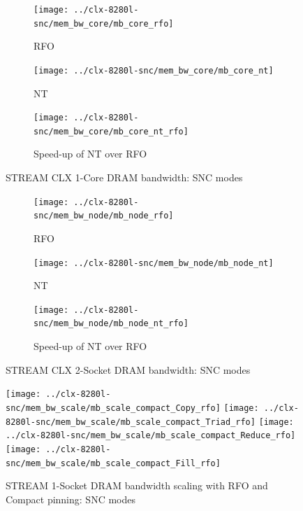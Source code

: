 \documentclass{article}
\begin{document}
\begin{figure}[!hb]
    \centering
    \begin{subfigure}[!hb]{0.3\textwidth}
         \centering
         \texttt{[image: ../clx-8280l-snc/mem\_bw\_core/mb\_core\_rfo]}
         \caption{RFO}
         \label{figure:mem_bw_core_rfo_clx_snc}
    \end{subfigure}
    \begin{subfigure}[!hb]{0.3\textwidth}
         \centering
         \texttt{[image: ../clx-8280l-snc/mem\_bw\_core/mb\_core\_nt]}
         \caption{NT}
         \label{figure:mem_bw_core_nt_clx_snc}
    \end{subfigure}
    \begin{subfigure}[!hb]{0.3\textwidth}
         \centering
         \texttt{[image: ../clx-8280l-snc/mem\_bw\_core/mb\_core\_nt\_rfo]}
         \caption{Speed-up of NT over RFO}
         \label{figure:mem_bw_core_nt_rfo_clx_snc}
    \end{subfigure}

    \caption{STREAM CLX 1-Core DRAM bandwidth: SNC modes}
    \label{figure:mem_bw_core_clx_snc}
\end{figure}

\begin{figure}[!hb]
    \centering
    \begin{subfigure}[!hb]{0.3\textwidth}
         \centering
         \texttt{[image: ../clx-8280l-snc/mem\_bw\_node/mb\_node\_rfo]}
         \caption{RFO}
         \label{figure:mem_bw_node_rfo_clx_snc}
    \end{subfigure}
    \begin{subfigure}[!hb]{0.3\textwidth}
         \centering
         \texttt{[image: ../clx-8280l-snc/mem\_bw\_node/mb\_node\_nt]}
         \caption{NT}
         \label{figure:mem_bw_node_nt_clx_snc}
    \end{subfigure}
    \begin{subfigure}[!hb]{0.3\textwidth}
         \centering
         \texttt{[image: ../clx-8280l-snc/mem\_bw\_node/mb\_node\_nt\_rfo]}
         \caption{Speed-up of NT over RFO}
         \label{figure:mem_bw_node_nt_rfo_clx_snc}
    \end{subfigure}

    \caption{STREAM CLX 2-Socket DRAM bandwidth: SNC modes}
    \label{figure:mem_bw_node_clx_snc}
\end{figure}


\begin{figure}[!hb]
    \centering
    \texttt{[image: ../clx-8280l-snc/mem\_bw\_scale/mb\_scale\_compact\_Copy\_rfo]}
    \texttt{[image: ../clx-8280l-snc/mem\_bw\_scale/mb\_scale\_compact\_Triad\_rfo]}
    \texttt{[image: ../clx-8280l-snc/mem\_bw\_scale/mb\_scale\_compact\_Reduce\_rfo]}
    \texttt{[image: ../clx-8280l-snc/mem\_bw\_scale/mb\_scale\_compact\_Fill\_rfo]}
    \caption{STREAM 1-Socket DRAM bandwidth scaling with RFO and Compact pinning: SNC modes}
    \label{figure:mem_bw_scale_compact_rfo_clx_snc}
\end{figure}
\end{document}
